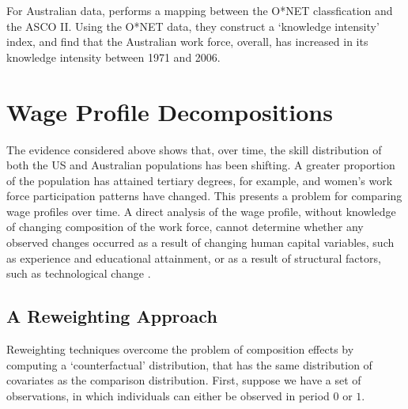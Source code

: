 For Australian data, \citet{Esposto2011} performs a mapping between the O*NET classfication and the ASCO II. Using the O*NET data, they  construct a `knowledge intensity' index, and find that the Australian work force, overall, has increased in its knowledge intensity between 1971 and 2006.

\section{Wage Profile Decompositions}

The evidence considered above shows that, over time, the skill distribution of both the US and Australian populations has been shifting. A greater proportion of the population has attained tertiary degrees, for example, and women's work force participation patterns have changed. This presents a problem for comparing wage profiles over time. A direct analysis of the wage profile, without knowledge of changing composition of the work force, cannot determine whether any observed changes occurred as a result of changing human capital variables, such as experience and educational attainment, or as a result of structural factors, such as technological change \citep[][see, e.g.]{Mincer1974}. 

\subsection{A Reweighting Approach}\label{sec:reweight}

Reweighting techniques overcome the problem of composition effects by computing a `counterfactual' distribution, that has the same distribution of covariates as the comparison distribution. First, suppose we have a set of observations, in which individuals can either be observed in period $0$ or $1$.

